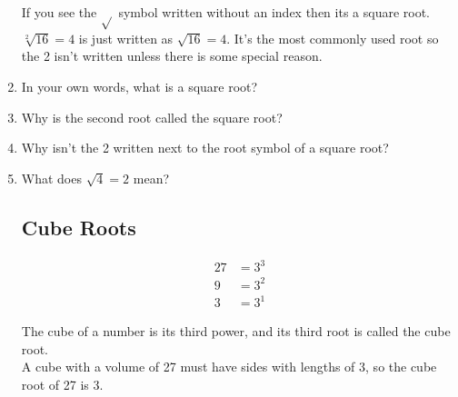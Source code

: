 \documentclass[12pt]{article}
\begin{document}
\begin{enumerate}
If you see the $\sqrt{}$ symbol written without an index then its a square root.  $\sqrt[2]{16} = 4$ is just written as $\sqrt{16} = 4.$ It’s the most commonly used root so the 2 isn’t written unless there is some special reason.

\item In your own words, what is a square root?
\item Why is the second root called the square root?
\item Why isn't the 2 written next to the root symbol of a square root?
\item What does $\sqrt{4}=2$ mean?

\subsection*{Cube Roots}
\begin{align*}
27 &= 3^3\\
9 &= 3^2\\
3 &= 3^1
\end{align*}

The cube of a number is its third power, and its third root is called the cube root.\\

A cube with a volume of 27 must have sides with lengths of 3, so the cube root of 27 is 3.\\

\vspace{28pt}


\end{enumerate}
\end{document}

